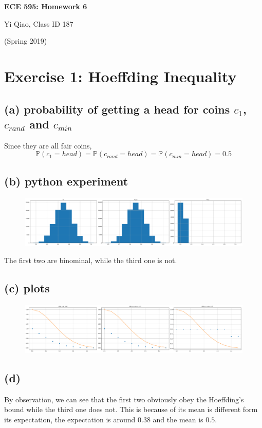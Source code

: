 \documentclass[11pt]{article}
\begin{document}
\begin{center}
\Large{\textbf{ECE 595: Homework 6}}

Yi Qiao, Class ID 187

(Spring 2019)
\end{center}

\section*{Exercise 1: Hoeffding Inequality}
\subsection*{(a) probability of getting a head for coins $c_1$, $c_{rand}$ and $c_{min}$}
Since they are all fair coins,
$$\mathbb{P}(c_1=head)=\mathbb{P}(c_{rand}=head)=\mathbb{P}(c_{min}=head)=0.5$$
\subsection*{(b) python experiment}
\begin{figure}[h]
	\centering
	\includegraphics[width=\linewidth]{exercise1_b}
\end{figure}

The first two are binominal, while the third one is not.
\subsection*{(c) plots}
\begin{figure}[h]
	\centering
	\includegraphics[width=\linewidth]{exercise1_c}
\end{figure}
\subsection*{(d)}
By observation, we can see that the first two obviously obey the Hoeffding's bound while the third one does not. This is because of its mean is different form its expectation, the expectation is around $0.38$ and the mean is $0.5$.
\end{document}
